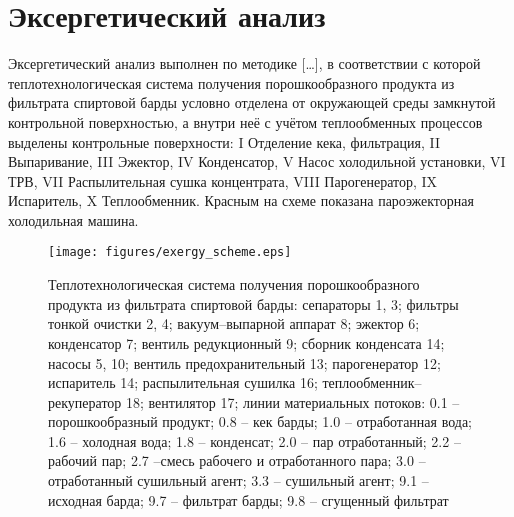 \section{Эксергетический анализ}

Эксергетический анализ выполнен по методике [\ldots], в соответствии с которой теплотехнологическая система получения порошкообразного продукта из фильтрата спиртовой барды условно отделена от окружающей среды замкнутой контрольной поверхностью, а внутри неё с учётом теплообменных процессов выделены контрольные поверхности: I Отделение кека, фильтрация, II Выпаривание, III Эжектор, IV Конденсатор, V Насос холодильной установки, VI ТРВ, VII Распылительная сушка концентрата, VIII Парогенератор, IX Испаритель, X Теплообменник.
Красным на схеме показана пароэжекторная холодильная машина.

\begin{figure}[!htb]
\centering
\texttt{[image: figures/exergy\_scheme.eps]}
\caption[Теплотехнологическая система получения порошкообразного продукта из фильтрата спиртовой барды]{Теплотехнологическая система получения порошкообразного продукта из фильтрата спиртовой барды:
сепараторы 1, 3; фильтры тонкой очистки 2, 4; вакуум--выпарной аппарат 8; эжектор 6; конденсатор 7; вентиль редукционный 9; сборник конденсата 14; насосы 5, 10; вентиль предохранительный 13; парогенератор 12; испаритель 14; распылительная сушилка 16; теплообменник--рекуператор 18; вентилятор 17; линии материальных потоков: 0.1 -- порошкообразный продукт; 0.8 -- кек барды; 1.0 -- отработанная вода; 1.6 -- холодная вода; 1.8 -- конденсат; 2.0 -- пар отработанный; 2.2 -- рабочий пар; 2.7 --смесь рабочего и отработанного пара; 3.0 -- отработанный сушильный агент; 3.3 -- сушильный агент; 9.1 -- исходная барда; 9.7 -- фильтрат барды; 9.8 -- сгущенный фильтрат}\label{fiq:exergy_sheme}
\end{figure}

